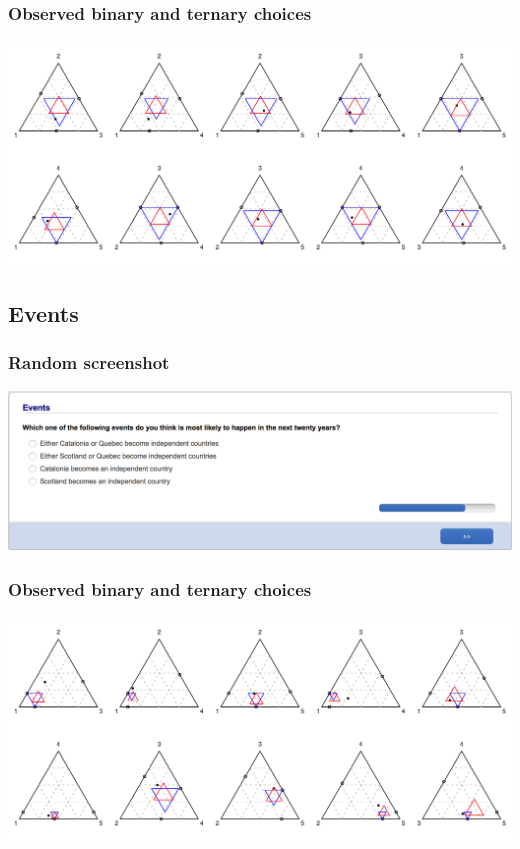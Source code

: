 \documentclass[11pt,letter]{article}
\begin{document}
\subsubsection*{Observed binary and ternary choices}

\includegraphics[width=15cm]{./Population_study_data/Simplexes/Colour_Pairs.pdf}

\pagebreak

\subsection*{Events}



\subsubsection*{Random screenshot}

\includegraphics[width=15cm]{Population_study_design/screenshot_Events.png}

\subsubsection*{Observed binary and ternary choices}

\includegraphics[width=15cm]{./Population_study_data/Simplexes/Events.pdf}
\end{document}

